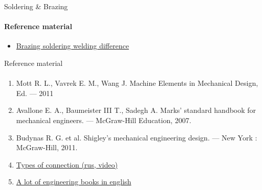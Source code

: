 \documentclass[aspectratio=169]{beamer}
\newcommand{\fbckg}[1]{\usebackgroundtemplate{\texttt{[image: \#1]}}}%
\begin{document}
\begin{frame}[t]{Soldering \& Brazing}
    \framesubtitle{Reference material}
    \begin{itemize}
        \item \href{https://www.uti.edu/blog/welding/brazing-soldering-welding}{Brazing soldering welding difference}
    \end{itemize}
\end{frame}

\begin{frame}[t]{Reference material}
    \framesubtitle{}
    \begin{enumerate}
        \item Mott R. L., Vavrek E. M., Wang J. Machine Elements in Mechanical Design, Ed. --- 2011
        \item Avallone E. A., Baumeister III T., Sadegh A. Marks' standard handbook for mechanical engineers. --- McGraw-Hill Education, 2007.
        \item Budynas R. G. et al. Shigley's mechanical engineering design. --- New York : McGraw-Hill, 2011.
        \item \href{https://youtu.be/jyun8hmWjS4}{Types of connection (rus, video)}
        \item \href{https://engineeringbookspdf.com/category/mechanical-engineering-pdf-books/}{A lot of engineering books in english}
    \end{enumerate}

\end{frame}



\fbckg{fibeamer/figs/last_page.png}
\frame[plain]{}
\end{document}
